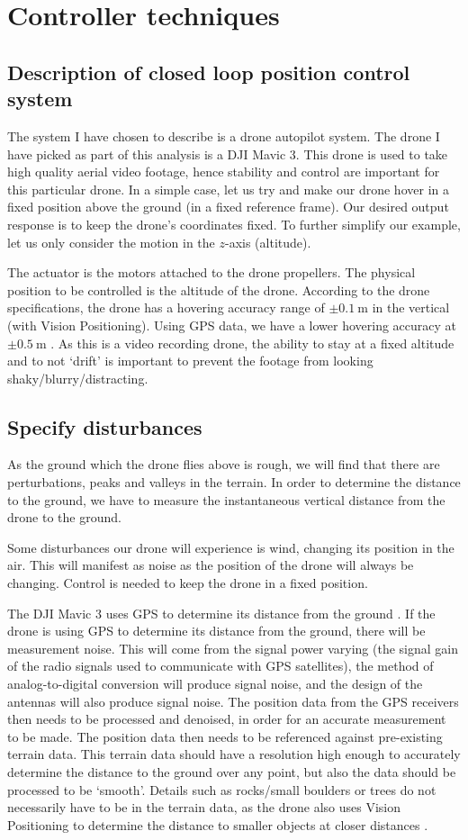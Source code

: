 \documentclass[11pt]{article}
\numberwithin{equation}{section}
\begin{document}
\section{Controller techniques}
\subsection{Description of closed loop position control system}
The system I have chosen to describe is a drone autopilot system. The drone I have picked as part of this analysis is a DJI Mavic 3. This drone is used to take high quality aerial video footage, hence stability and control are important for this particular drone. In a simple case, let us try and make our drone hover in a fixed position above the ground (in a fixed reference frame). Our desired output response is to keep the drone's coordinates fixed. To further simplify our example, let us only consider the motion in the $z$-axis (altitude).

The actuator is the motors attached to the drone propellers. The physical position to be controlled is the altitude of the drone. According to the drone specifications, the drone has a hovering accuracy range of $\pm\SI{0.1}{\metre}$ in the vertical (with Vision Positioning). Using GPS data, we have a lower hovering accuracy at $\pm \SI{0.5}{\metre}$ \citep{dji}. As this is a video recording drone, the ability to stay at a fixed altitude and to not `drift' is important to prevent the footage from looking shaky/blurry/distracting.
\subsection{Specify disturbances}
As the ground which the drone flies above is rough, we will find that there are perturbations, peaks and valleys in the terrain. In order to determine the distance to the ground, we have to measure the instantaneous vertical distance from the drone to the ground.

Some disturbances our drone will experience is wind, changing its position in the air. This will manifest as noise as the position of the drone will always be changing. Control is needed to keep the drone in a fixed position.

The DJI Mavic 3 uses GPS to determine its distance from the ground \citep{dji}. If the drone is using GPS to determine its distance from the ground, there will be measurement noise. This will come from the signal power varying (the signal gain of the radio signals used to communicate with GPS satellites), the method of analog-to-digital conversion will produce signal noise, and the design of the antennas will also produce signal noise. The position data from the GPS receivers then needs to be processed and denoised, in order for an accurate measurement to be made. The position data then needs to be referenced against pre-existing terrain data. This terrain data should have a resolution high enough to accurately determine the distance to the ground over any point, but also the data should be processed to be `smooth'. Details such as rocks/small boulders or trees do not necessarily have to be in the terrain data, as the drone also uses Vision Positioning to determine the distance to smaller objects at closer distances \citep{dji}.
\end{document}
